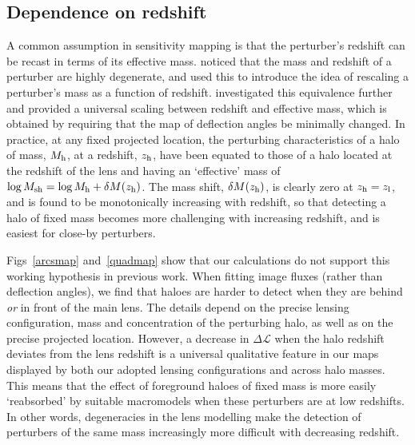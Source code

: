 \documentclass[a4paper, fleqn, usenatbib, useAMS]{mnras}
\def\DL{\Delta\mathscr{L}}
\begin{document}
\subsection{Dependence on redshift}
\label{redshiftdependence0}

A common assumption in sensitivity mapping is that the perturber's redshift can be recast in terms of its effective mass. 
\citet{Li2016} noticed that the mass and redshift of a perturber are highly 
degenerate, and used this to introduce the idea of rescaling a perturber's 
mass as a function of redshift.
\citet{Despali2018} investigated this equivalence further and provided a universal scaling between redshift and effective mass, which is obtained by requiring that 
the map of deflection angles be minimally changed. In practice, at any fixed projected location, 
the perturbing characteristics of a halo of mass, $M_{\rm h}$, at a redshift, $z_{\rm h}$, have been equated to 
those of a halo located at the redshift of the lens and having an `effective' mass of $\log M_{\rm sh}=\log M_{\rm h}+\delta M(z_{\rm h})$.  
The mass shift, $\delta M(z_{\rm h})$, is clearly zero at $z_{\rm h}=z_{\rm l}$, and is found to be monotonically increasing with 
redshift, so that detecting a halo of fixed mass becomes more challenging with increasing redshift, 
and is easiest for close-by perturbers.

Figs~\ref{arcsmap} and~\ref{quadmap} show that our calculations do not
support this working hypothesis in previous work. When fitting image
fluxes (rather than deflection angles), we find that haloes are harder
to detect when they are behind {\it or} in front of the main lens.  
The details depend on the precise lensing configuration, mass and concentration 
of the perturbing halo, as well as on the precise projected location. However, a decrease in $\DL$ when the halo redshift deviates from the lens redshift 
is a universal qualitative feature in our maps displayed by both our adopted lensing configurations
and across halo masses.
This means that the effect of foreground haloes of fixed mass is more easily `reabsorbed' by suitable 
macromodels when these perturbers are at low redshifts.
In other words, degeneracies in the lens modelling make the detection of perturbers of the same mass
increasingly more difficult with decreasing redshift.  
\end{document}
